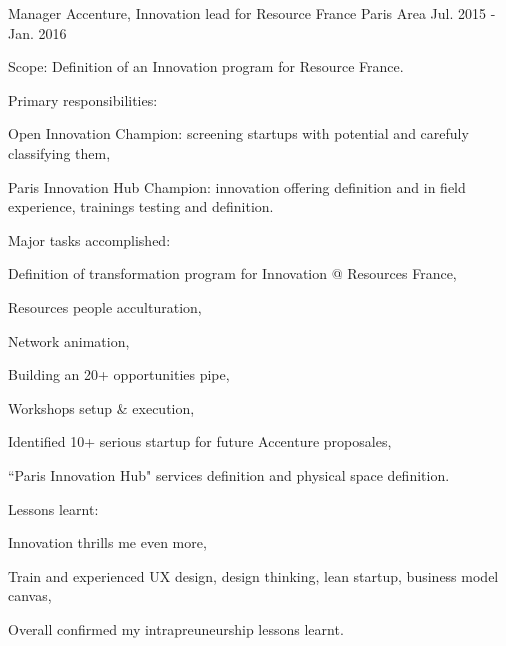 \begin{cventries}
  \cventry
    {Manager} %
    {Accenture, Innovation lead for Resource France} %
    {Paris Area} %
    {Jul. 2015 - Jan. 2016} %
    {
      \begin{cvitems} %
        \item {Scope: Definition of an Innovation program for Resource France.}
        \item {Primary responsibilities:}
        \begin{cvsubitems}
          \item {Open Innovation Champion: screening startups with potential and carefuly classifying them,}
          \item {Paris Innovation Hub Champion: innovation offering definition and in field experience, trainings testing and definition.}
        \end{cvsubitems}
        \item {Major tasks accomplished:}
        \begin{cvsubitems}
          \item {Definition of transformation program for Innovation @ Resources France,}
          \item {Resources people acculturation,}
          \item {Network animation,}
          \item {Building an 20+ opportunities pipe,}
          \item {Workshops setup \& execution,}
          \item {Identified 10+ serious startup for future Accenture proposales,}
          \item {``Paris Innovation Hub" services definition and physical space definition.}
        \end{cvsubitems}
        \item {Lessons learnt:}
        \begin{cvsubitems}
          \item {Innovation thrills me even more,}
          \item {Train and experienced UX design, design thinking, lean startup, business model canvas,}
          \item {Overall confirmed my intrapreuneurship lessons learnt.}
        \end{cvsubitems}
      \end{cvitems}
    }


\end{cventries}
